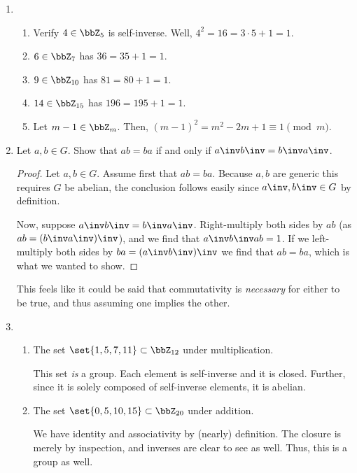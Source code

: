 \documentclass{article}
\begin{document}
\begin{enumerate}
  \item \begin{enumerate}
          \item Verify $4 \in \bbZ_{5}$ is self-inverse. Well, $4^{2} = 16 = 3 \cdot 5 + 1 = 1$.
          \item $6 \in \bbZ_{7}$ has $36 = 35 + 1 = 1$.
          \item $9 \in \bbZ_{10}$ has $81 = 80 + 1 = 1$.
          \item $14 \in \bbZ_{15}$ has $196 = 195 + 1 = 1$.
          \item Let $m - 1 \in \bbZ_{m}$. Then, $(m - 1)^{2} = m^{2} - 2m + 1 \equiv 1 \pmod{m}$.
        \end{enumerate}


  \item Let $a, b \in G$. Show that $ab = ba$ if and only if $a\inv b\inv = b \inv a \inv$.
        \begin{proof}
          Let $a, b \in G$. Assume first that $ab = ba$.
          Because $a, b$ are generic this requires $G$ be abelian,
          the conclusion follows easily since $a\inv, b\inv \in G$ by definition.

          Now, suppose $a\inv b \inv = b \inv a \inv$.
          Right-multiply both sides by $ab$ (as $ab = (b \inv a \inv)\inv$), and we find that
          $a\inv b\inv ab = 1$. If we left-multiply both sides by $ba = (a\inv b\inv)\inv$ we find that
          $ab = ba$, which is what we wanted to show.
        \end{proof}

        This feels like it could be said that commutativity is \emph{necessary} for either to be true, and thus
        assuming one implies the other.

  \item \begin{enumerate}
          \item The set $\set{1, 5, 7, 11} \subset \bbZ_{12}$ under multiplication.

                This set \emph{is} a group.
                Each element is self-inverse and it is closed.
                Further, since it is solely composed of self-inverse elements, it is abelian.

          \item The set $\set{0, 5, 10, 15} \subset \bbZ_{20}$ under addition.

                We have identity and associativity by (nearly) definition.
                The closure is merely by inspection, and inverses are clear to see as well.
                Thus, this is a group as well.
        \end{enumerate}


\end{enumerate}
\end{document}
